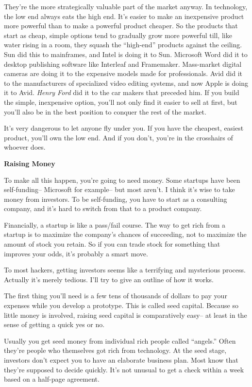 \documentclass[12pt]{book}
\begin{document}
They're the more strategically valuable part of the market anyway. In
technology, the low end always eats the high end. It's easier to make an
inexpensive product more powerful than to make a powerful product
cheaper. So the products that start as cheap, simple options tend to
gradually grow more powerful till, like water rising in a room, they
squash the ``high-end'' products against the ceiling. Sun did this to
mainframes, and Intel is doing it to Sun. Microsoft Word did it to
desktop publishing software like Interleaf and Framemaker. Mass-market
digital cameras are doing it to the expensive models made for
professionals. Avid did it to the manufacturers of specialized video
editing systems, and now Apple is doing it to Avid. \emph{Henry Ford}
did it to the car makers that preceded him. If you build the simple,
inexpensive option, you'll not only find it easier to sell at first, but
you'll also be in the best position to conquer the rest of the market.

It's very dangerous to let anyone fly under you. If you have the
cheapest, easiest product, you'll own the low end. And if you don't,
you're in the crosshairs of whoever does.

\textbf{Raising Money}

To make all this happen, you're going to need money. Some startups have
been self-funding-- Microsoft for example-- but most aren't. I think
it's wise to take money from investors. To be self-funding, you have to
start as a consulting company, and it's hard to switch from that to a
product company.

Financially, a startup is like a pass/fail course. The way to get rich
from a startup is to maximize the company's chances of succeeding, not
to maximize the amount of stock you retain. So if you can trade stock
for something that improves your odds, it's probably a smart move.

To most hackers, getting investors seems like a terrifying and
mysterious process. Actually it's merely tedious. I'll try to give an
outline of how it works.

The first thing you'll need is a few tens of thousands of dollars to pay
your expenses while you develop a prototype. This is called seed
capital. Because so little money is involved, raising seed capital is
comparatively easy-- at least in the sense of getting a quick yes or no.

Usually you get seed money from individual rich people called
``angels.'' Often they're people who themselves got rich from
technology. At the seed stage, investors don't expect you to have an
elaborate business plan. Most know that they're supposed to decide
quickly. It's not unusual to get a check within a week based on a
half-page agreement.
\end{document}
